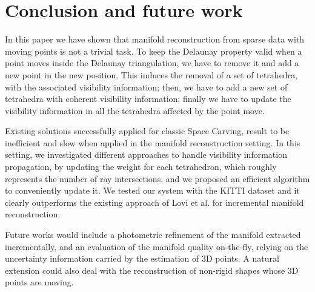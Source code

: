 \section{Conclusion and future work}
\label{sec:conclusion}
In this paper we have shown that manifold reconstruction from sparse data with moving points is not a trivial task. To keep the Delaunay property valid when a point moves inside the Delaunay triangulation, we have to remove it and add a new point in the new position. This induces the removal of a set of tetrahedra, with the associated visibility information; then, we have to add a new set of tetrahedra with coherent visibility information; finally we have to update the visibility information in all the tetrahedra affected by the point move.

Existing solutions successfully applied for classic Space Carving, result to be inefficient and slow when applied in the manifold reconstruction setting. 
In this setting, we investigated different approaches to handle visibility information propagation, by updating the weight for each tetrahedron, which roughly represents  the number of ray intersections, and we proposed an efficient algorithm to conveniently update it. 
We tested our system with the KITTI dataset and it clearly outperforms the existing approach of Lovi et al. \cite{Lovi_et_al_11} for incremental manifold reconstruction.

Future works would include a photometric refinement of the manifold extracted incrementally, and an evaluation of the manifold quality on-the-fly, relying on the uncertainty information carried by the estimation of 3D points. 
A natural extension could also deal with the reconstruction of non-rigid shapes whose 3D points are moving.


